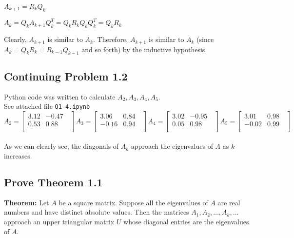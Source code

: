 \documentclass[12pt]{article}
\begin{document}
$A_{k+1} = R_kQ_k$ 

$A_k = Q_k A_{k+1} Q_k^T  =  Q_k R_kQ_k Q_k^T = Q_k R_k$

Clearly, $A_{k+1}$ is similar to $A_k$. Therefore, $A_{k+1}$ is similar to $A_k$ (since $A_k = Q_kR_k = R_{k-1}Q_{k-1}$ and so forth) by the inductive hypothesis.



\subsection{Continuing Problem  1.2}
Python code was written to calculate $A_2, A_3, A_4, A_5$. \\
See attached file \texttt{Q1-4.ipynb}
\\
$$
A_2 = \begin{bmatrix}
3.12 & -0.47 & \\
0.53 & 0.88 & \\
\end{bmatrix}
A_3 = \begin{bmatrix}
3.06 & 0.84 & \\
-0.16 & 0.94 & \\
\end{bmatrix}
A_4 = \begin{bmatrix}
3.02 & -0.95 & \\
0.05 & 0.98 & \\
\end{bmatrix}
A_5 = \begin{bmatrix}
3.01 & 0.98 & \\
-0.02 & 0.99 & \\
\end{bmatrix}
$$ \\ 

As we can clearly see, the diagonals of $A_k$ approach the eigenvalues of $A$ as $k$ increases.


\subsection{Prove Theorem 1.1}
\textbf{Theorem:} Let $A$ be a square matrix. Suppose all the eigenvalues of $A$ are real numbers and have distinct absolute values. Then the matrices $A_1, A_2, \dots, A_k, \dots$ approach an upper triangular matrix $U$ whose diagonal entries are the eigenvalues of $A$.
\end{document}
